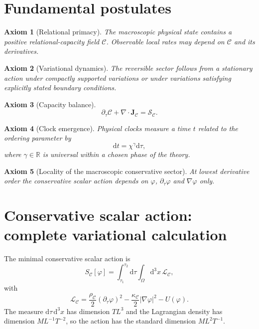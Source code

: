 \documentclass[11pt,a4paper]{article}
\newtheorem{axiom}{Axiom}[section]
\newcommand{\C}{\mathcal{C}}
\newcommand{\Jc}{\mathbf{J}_{\mathcal{C}}}
\newcommand{\Sc}{\mathcal{S}_{\mathcal{C}}}
\renewcommand{\dd}{\mathrm{d}}
\newcommand{\Lag}{\mathcal{L}}
\newcommand{\rhoC}{\rho_{\mathcal{C}}}
\newcommand{\kC}{\kappa_{\mathcal{C}}}
\begin{document}
\section{Fundamental postulates}

\begin{axiom}[Relational primacy]
The macroscopic physical state contains a positive relational-capacity field \(\C\). Observable local rates may depend on \(\C\) and its derivatives.
\end{axiom}

\begin{axiom}[Variational dynamics]
The reversible sector follows from a stationary action under compactly supported variations or under variations satisfying explicitly stated boundary conditions.
\end{axiom}

\begin{axiom}[Capacity balance]
\[
\partial_\tau\C+\nabla\cdot\Jc=\Sc.
\]
\end{axiom}

\begin{axiom}[Clock emergence]
Physical clocks measure a time \(t\) related to the ordering parameter by
\[
\dd t=\chi^\gamma\dd\tau,
\]
where \(\gamma\in\mathbb{R}\) is universal within a chosen phase of the theory.
\end{axiom}

\begin{axiom}[Locality of the macroscopic conservative sector]
At lowest derivative order the conservative scalar action depends on \(\varphi\), \(\partial_\tau\varphi\) and \(\nabla\varphi\) only.
\end{axiom}

\section{Conservative scalar action: complete variational calculation}

The minimal conservative scalar action is
\begin{equation}
S_{\C}[\varphi]=\int_{\tau_1}^{\tau_2}\dd\tau\int_\Omega\dd^3x\,\Lag_{\C},
\label{eq:scalar-action}
\end{equation}
with
\[
\Lag_{\C}=\frac{\rhoC}{2}(\partial_\tau\varphi)^2-\frac{\kC}{2}|\nabla\varphi|^2-U(\varphi).
\]
The measure \(\dd\tau\,\dd^3x\) has dimension \(TL^3\) and the Lagrangian density has dimension \(ML^{-1}T^{-2}\), so the action has the standard dimension \(ML^2T^{-1}\).
\end{document}
